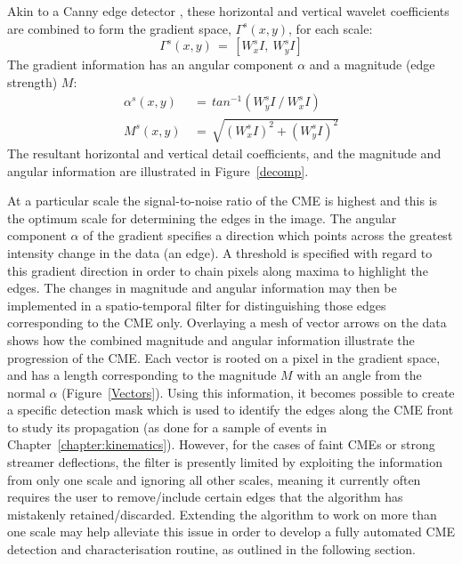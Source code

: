 \documentclass[namedreferences]{SolarPhysics}
\begin{document}
\begin{article}
Akin to a Canny edge detector \citep{2008SoPh..248..457Y}, these horizontal and vertical wavelet coefficients are combined to form the gradient space, $\Gamma^s(x,y)$, for each scale: 
\begin{equation}
\Gamma^s (x,y)\, = \,\left[W_{x}^s I,~W_{y}^s I \right]
\end{equation}
The gradient information has an angular component $\alpha$ and a magnitude (edge strength) $M$:
\begin{eqnarray}
\alpha^s(x,y) \, &= \, tan^{-1}\left( W_{y}^s I~/~W_{x}^s I \right) \\
M^s(x,y) \, &= \, \sqrt{ ( W_{x}^s I ) ^2 + ( W_{y}^s I ) ^2 }
\end{eqnarray}
The resultant horizontal and vertical detail coefficients, and the magnitude and angular information are illustrated in Figure~\ref{decomp}.

At a particular scale the signal-to-noise ratio of the CME is highest and this is the optimum scale for determining the edges in the image. The angular component $\alpha$ of the gradient specifies a direction which points across the greatest intensity change in the data (an edge). A threshold is specified with regard to this gradient direction in order to chain pixels along maxima to highlight the edges. The changes in magnitude and angular information may then be implemented in a spatio-temporal filter for distinguishing those edges corresponding to the CME only. Overlaying a mesh of vector arrows on the data shows how the combined magnitude and angular information illustrate the progression of the CME. Each vector is rooted on a pixel in the gradient space, and has a length corresponding to the magnitude $M$ with an angle from the normal $\alpha$ (Figure~\ref{Vectors}). Using this information, it becomes possible to create a specific detection mask which is used to identify the edges along the CME front to study its propagation (as done for a sample of events in Chapter~\ref{chapter:kinematics}). However, for the cases of faint CMEs or strong streamer deflections, the filter is presently limited by exploiting the information from only one scale and ignoring all other scales, meaning it currently often requires the user to remove/include certain edges that the algorithm has mistakenly retained/discarded. Extending the algorithm to work on more than one scale may help alleviate this issue in order to develop a fully automated CME detection and characterisation routine, as outlined in the following section.


\end{article}
\end{document}
